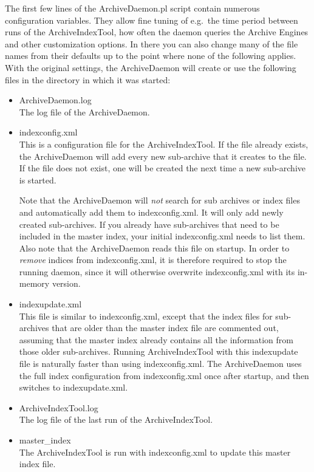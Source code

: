 \noindent The first few lines of the ArchiveDaemon.pl script contain
numerous configuration variables. They allow fine tuning of e.g.\ the
time period between runs of the ArchiveIndexTool, how often the daemon
queries the Archive Engines and other customization options. In there
you can also change many of the file names from their defaults up to
the point where none of the following applies. With the original
settings, the ArchiveDaemon will create or use the following files in
the directory in which it was started:
\begin{itemize}
\item ArchiveDaemon.log\\
  The log file of the ArchiveDaemon.
\item indexconfig.xml\\
  This is a configuration file for the ArchiveIndexTool.  If the file
  already exists, the ArchiveDaemon will add every new sub-archive
  that it creates to the file. If the file does not exist, one will be
  created the next time a new sub-archive is started.

  Note that the ArchiveDaemon will \emph{not} search for sub archives
  or index files and automatically add them to indexconfig.xml. It
  will only add newly created sub-archives. If you already have
  sub-archives that need to be included in the master index, your
  initial indexconfig.xml needs to list them.
  Also note that the ArchiveDaemon reads this file on startup. In
  order to \emph{remove} indices from indexconfig.xml, it is therefore
  required to stop the running daemon, since it will otherwise
  overwrite indexconfig.xml with its in-memory version.
\item indexupdate.xml\\
  This file is similar to indexconfig.xml, except that the index files
  for sub-archives that are older than the master index file are
  commented out, assuming that the master index already contains all
  the information from those older sub-archives.
  Running ArchiveIndexTool with this indexupdate file is naturally faster
  than using indexconfig.xml. The ArchiveDaemon uses the full index
  configuration from indexconfig.xml once after startup, and then
  switches to indexupdate.xml.
\item ArchiveIndexTool.log\\
  The log file of the last run of the ArchiveIndexTool.
\item master\_index\\
  The ArchiveIndexTool is run with indexconfig.xml to update
  this master index file.
\end{itemize}

